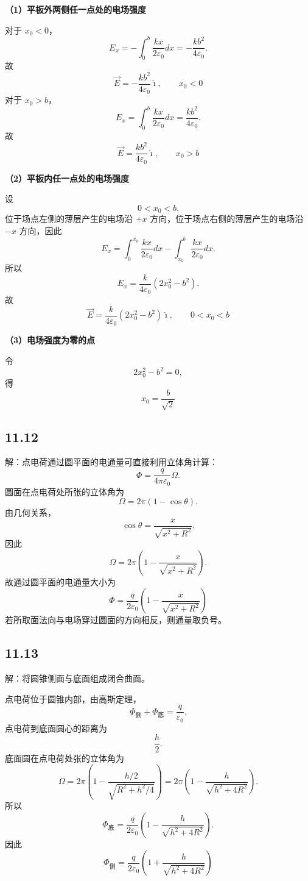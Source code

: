 \documentclass[UTF8,a4paper,12pt]{ctexart}
\begin{document}
\textbf{（1）平板外两侧任一点处的电场强度}

对于 $x_0<0$，
\[
E_x
=
-\int_0^b
\frac{kx}{2\varepsilon_0}dx
=
-\frac{kb^2}{4\varepsilon_0}.
\]
故
\[
\boxed{
\vec{E}
=
-\frac{kb^2}{4\varepsilon_0}\hat{\imath},
\qquad x_0<0
}
\]
对于 $x_0>b$，
\[
E_x
=
\int_0^b
\frac{kx}{2\varepsilon_0}dx
=
\frac{kb^2}{4\varepsilon_0}.
\]
故
\[
\boxed{
\vec{E}
=
\frac{kb^2}{4\varepsilon_0}\hat{\imath},
\qquad x_0>b
}
\]

\textbf{（2）平板内任一点处的电场强度}

设
\[
0<x_0<b.
\]
位于场点左侧的薄层产生的电场沿 $+x$ 方向，位于场点右侧的薄层产生的电场沿 $-x$ 方向，因此
\[
E_x
=
\int_0^{x_0}
\frac{kx}{2\varepsilon_0}dx
-
\int_{x_0}^{b}
\frac{kx}{2\varepsilon_0}dx.
\]
所以
\[
E_x
=
\frac{k}{4\varepsilon_0}
\left(2x_0^2-b^2\right).
\]
故
\[
\boxed{
\vec{E}
=
\frac{k}{4\varepsilon_0}
\left(2x_0^2-b^2\right)\hat{\imath},
\qquad 0<x_0<b
}
\]

\textbf{（3）电场强度为零的点}

令
\[
2x_0^2-b^2=0,
\]
得
\[
\boxed{
x_0=\frac{b}{\sqrt{2}}
}
\]

\subsection*{11.12}

解：点电荷通过圆平面的电通量可直接利用立体角计算：
\[
\Phi
=
\frac{q}{4\pi\varepsilon_0}\Omega.
\]
圆面在点电荷处所张的立体角为
\[
\Omega
=
2\pi(1-\cos\theta).
\]
由几何关系，
\[
\cos\theta
=
\frac{x}{\sqrt{x^2+R^2}}.
\]
因此
\[
\Omega
=
2\pi
\left(
1-\frac{x}{\sqrt{x^2+R^2}}
\right).
\]
故通过圆平面的电通量大小为
\[
\boxed{
\Phi
=
\frac{q}{2\varepsilon_0}
\left(
1-\frac{x}{\sqrt{x^2+R^2}}
\right)
}
\]
若所取面法向与电场穿过圆面的方向相反，则通量取负号。

\subsection*{11.13}

解：将圆锥侧面与底面组成闭合曲面。

点电荷位于圆锥内部，由高斯定理，
\[
\Phi_{\text{侧}}+\Phi_{\text{底}}
=
\frac{q}{\varepsilon_0}.
\]
点电荷到底面圆心的距离为
\[
\frac{h}{2}.
\]
底面圆在点电荷处张的立体角为
\[
\Omega
=
2\pi
\left(
1-
\frac{h/2}{\sqrt{R^2+h^2/4}}
\right)
=
2\pi
\left(
1-\frac{h}{\sqrt{h^2+4R^2}}
\right).
\]
所以
\[
\Phi_{\text{底}}
=
\frac{q}{2\varepsilon_0}
\left(
1-\frac{h}{\sqrt{h^2+4R^2}}
\right).
\]
因此
\[
\boxed{
\Phi_{\text{侧}}
=
\frac{q}{2\varepsilon_0}
\left(
1+\frac{h}{\sqrt{h^2+4R^2}}
\right)
}
\]
\end{document}
